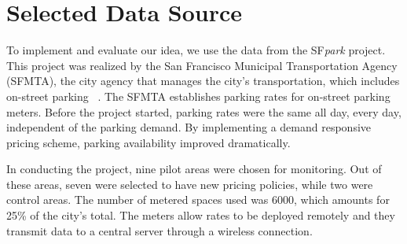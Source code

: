 \section{Selected Data Source}
To implement and evaluate our idea, we use the data from the SF\textit{park} project. This project was realized by the San Francisco Municipal Transportation Agency (SFMTA), the city agency that manages the city's transportation, which includes on-street parking~\cite{sfpark} \cite{sfpark_evaluation}. The SFMTA establishes parking rates for on-street parking meters. Before the project started, parking rates were the same all day, every day, independent of the parking demand. By implementing a demand responsive pricing scheme, parking availability improved dramatically. 
%

In conducting the project, nine pilot areas were chosen for monitoring. Out of these areas, seven were selected to have new pricing policies, while two were control areas. The number of metered spaces used was 6000, which amounts for 25\% of the city's total. The meters allow rates to be deployed remotely and they transmit data to a central server through a wireless connection.

